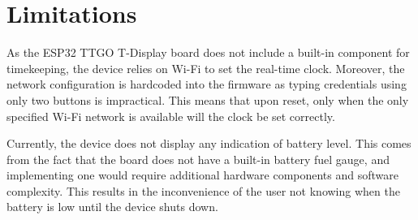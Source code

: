\section{Limitations}

As the ESP32 TTGO T-Display board does not include a built-in component for timekeeping, the device relies on Wi-Fi to set the real-time clock. Moreover, the network configuration is hardcoded into the firmware as typing credentials using only two buttons is impractical. This means that upon reset, only when the only specified Wi-Fi network is available will the clock be set correctly.

Currently, the device does not display any indication of battery level. This comes from the fact that the board does not have a built-in battery fuel gauge, and implementing one would require additional hardware components and software complexity. This results in the inconvenience of the user not knowing when the battery is low until the device shuts down.